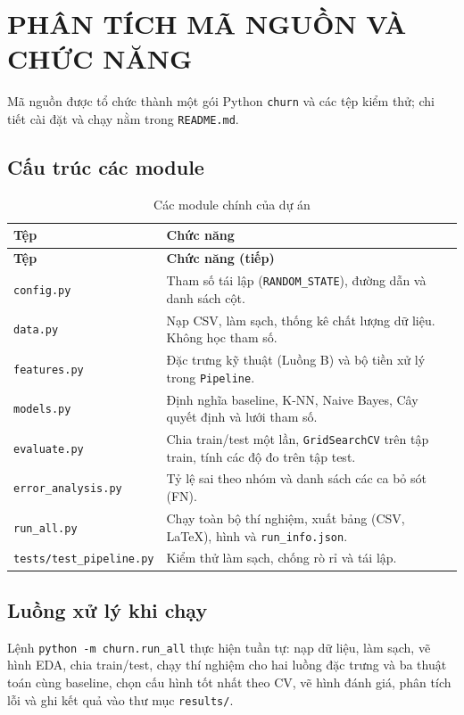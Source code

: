 \chapter{PHÂN TÍCH MÃ NGUỒN VÀ CHỨC NĂNG}

Mã nguồn được tổ chức thành một gói Python \texttt{churn} và các tệp kiểm thử; chi tiết cài đặt và chạy nằm trong \texttt{README.md}.

\section{Cấu trúc các module}
\begin{longtable}{p{4.2cm} p{10cm}}
    \caption{Các module chính của dự án} \label{tab:modules} \\
    \hline \textbf{Tệp} & \textbf{Chức năng} \\ \hline
    \endfirsthead
    \hline \textbf{Tệp} & \textbf{Chức năng (tiếp)} \\ \hline
    \endhead
    \texttt{config.py} & Tham số tái lập (\texttt{RANDOM\_STATE}), đường dẫn và danh sách cột. \\
    \texttt{data.py} & Nạp CSV, làm sạch, thống kê chất lượng dữ liệu. Không học tham số. \\
    \texttt{features.py} & Đặc trưng kỹ thuật (Luồng B) và bộ tiền xử lý trong \texttt{Pipeline}. \\
    \texttt{models.py} & Định nghĩa baseline, K-NN, Naive Bayes, Cây quyết định và lưới tham số. \\
    \texttt{evaluate.py} & Chia train/test một lần, \texttt{GridSearchCV} trên tập train, tính các độ đo trên tập test. \\
    \texttt{error\_analysis.py} & Tỷ lệ sai theo nhóm và danh sách các ca bỏ sót (FN). \\
    \texttt{run\_all.py} & Chạy toàn bộ thí nghiệm, xuất bảng (CSV, LaTeX), hình và \texttt{run\_info.json}. \\
    \texttt{tests/test\_pipeline.py} & Kiểm thử làm sạch, chống rò rỉ và tái lập. \\
\end{longtable}

\section{Luồng xử lý khi chạy}
Lệnh \texttt{python -m churn.run\_all} thực hiện tuần tự: nạp dữ liệu, làm sạch, vẽ hình EDA, chia train/test,
chạy thí nghiệm cho hai luồng đặc trưng và ba thuật toán cùng baseline, chọn cấu hình tốt nhất theo CV,
vẽ hình đánh giá, phân tích lỗi và ghi kết quả vào thư mục \texttt{results/}.

